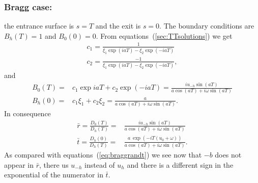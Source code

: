 \documentclass{iucr}
\begin{document}
\subsubsection{Bragg case:} the entrance surface is $s=T$ and the exit is $s=0$. The boundary conditions are $B_h(T)=1$ and $B_0(0)=0$. From equations~(\ref{sec:TTsolutions}) we get
\begin{subequations}
\begin{align}
c_1 = \frac{1}{\xi_1 \exp(i a T) - \xi_2 \exp(-i a T)}\\
c_2 = \frac{-1}{\xi_1 \exp(i a T) - \xi_2 \exp(-i a T)},
\end{align}
\end{subequations}
and 
\begin{subequations}
\begin{align}
B_0(T) = &c_1 \exp{i a T} + c_2 \exp(-i a T)=
\frac{i u_{-h} \sin(a T)}{a \cos(a T)+ i \omega \sin(a T)}\\
B_h(0) = &c_1 \xi_1 + c_2 \xi_2=
\frac{a}{a \cos(a T)+ i \omega \sin(a T)}.
\end{align}
\end{subequations}
In consequence
\begin{subequations}
\label{eq:braggrbarandtbar}
\begin{align}
\bar r = \frac{D_0(T)}{D_h(T)} = &
\frac{i u_{-h} \sin(a T)}{a \cos(a T)+ i \omega \sin(a T)}\\
\bar t = \frac{D_h(0)}{D_h(T)} = &
\frac{a ~ \exp(-i T (u_0+\omega))}{a \cos(a T)+ i \omega \sin(a T)} .
\end{align}
\end{subequations}
As compared with equations~(\ref{eq:braggrandt}) we see now that $-b$ does not appear in $\bar r$, there us $u_{-h}$ instead of $u_h$ and there is a different sign in the exponential of the numerator in $\bar t$. 







\end{document}
